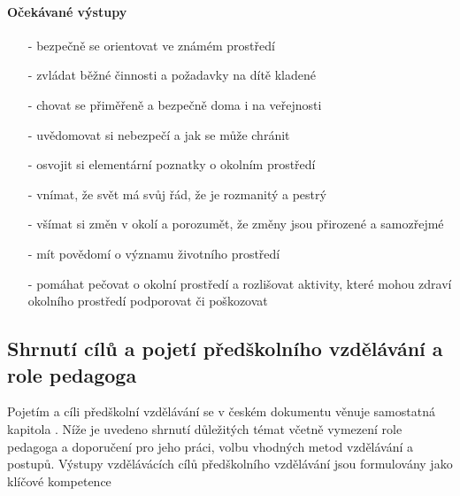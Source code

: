 				\paragraph{Očekávané výstupy}

				\begin{itemize}
				\setlength\itemsep{-2mm}
					\item[-]bezpečně se orientovat ve známém prostředí
					\item[-]zvládat běžné činnosti a požadavky na dítě kladené
					\item[-]chovat se přiměřeně a bezpečně doma i na veřejnosti
					\item[-]uvědomovat si nebezpečí a jak se může chránit
					\item[-]osvojit si elementární poznatky o okolním prostředí
					\item[-]vnímat, že svět má svůj řád, že je rozmanitý a pestrý
					\item[-]všímat si změn v okolí a porozumět, že změny jsou přirozené a samozřejmé
					\item[-]mít povědomí o významu životního prostředí
					\item[-]pomáhat pečovat o okolní prostředí a rozlišovat aktivity, které mohou zdraví okolního prostředí podporovat či poškozovat
				\end{itemize}

 			\subsection{Shrnutí cílů a pojetí předškolního vzdělávání a role pedagoga}

				Pojetím a cíli předškolní vzdělávání se v českém dokumentu věnuje samostatná kapitola . Níže je uvedeno shrnutí důležitých témat včetně vymezení role pedagoga a doporučení pro jeho práci, volbu vhodných metod vzdělávání a postupů. Výstupy vzdělávácích cílů předškolního vzdělávání jsou formulovány jako klíčové kompetence			

